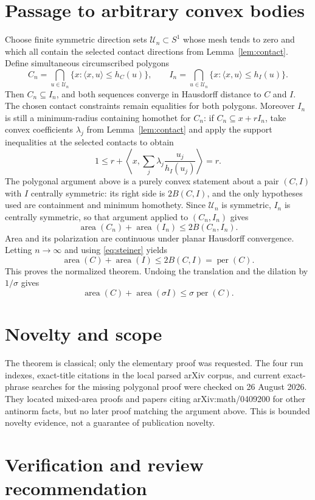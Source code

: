 \documentclass[11pt]{article}
\newcommand{\area}{\operatorname{area}}
\newcommand{\perim}{\operatorname{per}}
\begin{document}
\section{Passage to arbitrary convex bodies}

Choose finite symmetric direction sets $\mathcal U_n\subset S^1$ whose mesh
tends to zero and which all contain the selected contact directions from
Lemma~\ref{lem:contact}.  Define simultaneous circumscribed polygons
\[
 C_n=\bigcap_{u\in\mathcal U_n}
 \{x:\langle x,u\rangle\leq h_C(u)\},\qquad
 I_n=\bigcap_{u\in\mathcal U_n}
 \{x:\langle x,u\rangle\leq h_I(u)\}.
\]
Then $C_n\subseteq I_n$, and both sequences converge in Hausdorff distance
to $C$ and $I$.  The chosen contact constraints remain equalities for both
polygons.  Moreover $I_n$ is still a minimum-radius containing homothet for
$C_n$: if $C_n\subseteq x+rI_n$, take convex coefficients $\lambda_j$ from
Lemma~\ref{lem:contact} and apply the support inequalities at the selected
contacts to obtain
\[
 1\leq r+\left\langle x,
 \sum_j\lambda_j\frac{u_j}{h_I(u_j)}\right\rangle=r.
\]
The polygonal argument above is a purely convex statement about a pair
$(C,I)$ with $I$ centrally symmetric: its right side is $2B(C,I)$, and the
only hypotheses used are containment and minimum homothety.  Since
$\mathcal U_n$ is symmetric, $I_n$ is centrally symmetric, so that argument
applied to $(C_n,I_n)$ gives
\[
 \area(C_n)+\area(I_n)\leq 2B(C_n,I_n).
\]
Area and its polarization are continuous under planar Hausdorff convergence.
Letting $n\to\infty$ and using \eqref{eq:steiner} yields
\[
 \area(C)+\area(I)\leq2B(C,I)=\perim(C).
\]
This proves the normalized theorem.  Undoing the translation and the
dilation by $1/\sigma$ gives
\[
 \boxed{\area(C)+\area(\sigma I)\leq\sigma\perim(C)}.
\]

\section*{Novelty and scope}

The theorem is classical; only the elementary proof was requested.  The
four run indexes, exact-title citations in the local parsed arXiv corpus, and
current exact-phrase searches for the missing polygonal proof were checked on
26 August 2026.  They located mixed-area proofs and papers citing
arXiv:math/0409200 for other antinorm facts, but no later proof matching the
argument above.  This is bounded novelty evidence, not a guarantee of
publication novelty.

\section*{Verification and review recommendation}
\end{document}
